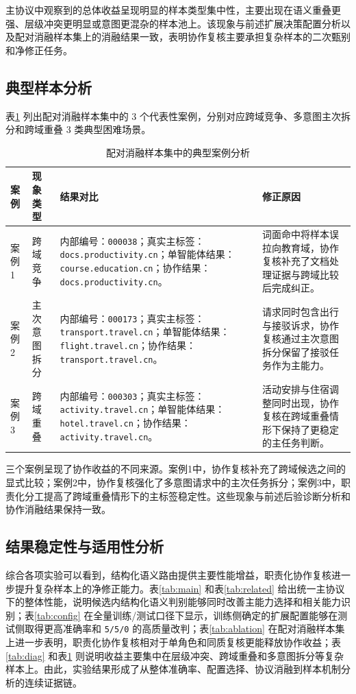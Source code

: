 \documentclass[10pt,a4paper,twocolumn,fontset=fandol]{ctexart}
\begin{document}
主协议中观察到的总体收益呈现明显的样本类型集中性，主要出现在语义重叠更强、层级冲突更明显或意图更混杂的样本池上。该现象与前述扩展决策配置分析以及配对消融样本集上的消融结果一致，表明协作复核主要承担复杂样本的二次甄别和净修正任务。

\subsection{典型样本分析}

表\ref{tab:cases} 列出配对消融样本集中的 3 个代表性案例，分别对应跨域竞争、多意图主次拆分和跨域重叠 3 类典型困难场景。

\begin{table}[htbp]
\centering
\caption{配对消融样本集中的典型案例分析}
\label{tab:cases}
\small
\setlength{\tabcolsep}{4pt}
\begin{tabular}{p{1.8cm}p{1.9cm}p{5.4cm}p{5.6cm}}
\toprule
案例 & 现象类型 & 结果对比 & 修正原因 \\
\midrule
案例1 & 跨域竞争 & 内部编号：\texttt{000038}；真实主标签：\texttt{docs.productivity.cn}；单智能体结果：\texttt{course.education.cn}；协作结果：\texttt{docs.productivity.cn}。 & 词面命中将样本误拉向教育域，协作复核补充了文档处理证据与跨域比较后完成纠正。 \\
案例2 & 主次意图拆分 & 内部编号：\texttt{000173}；真实主标签：\texttt{transport.travel.cn}；单智能体结果：\texttt{flight.travel.cn}；协作结果：\texttt{transport.travel.cn}。 & 请求同时包含出行与接驳诉求，协作复核通过主次意图拆分保留了接驳任务作为主能力。 \\
案例3 & 跨域重叠 & 内部编号：\texttt{000303}；真实主标签：\texttt{activity.travel.cn}；单智能体结果：\texttt{hotel.travel.cn}；协作结果：\texttt{activity.travel.cn}。 & 活动安排与住宿调整同时出现，协作复核在跨域重叠情形下保持了更稳定的主任务判断。 \\
\bottomrule
\end{tabular}
\end{table}

三个案例呈现了协作收益的不同来源。案例1中，协作复核补充了跨域候选之间的显式比较；案例2中，协作复核强化了多意图请求中的主次任务拆分；案例3中，职责化分工提高了跨域重叠情形下的主标签稳定性。这些现象与前述后验诊断分析和协作消融结果保持一致。

\subsection{结果稳定性与适用性分析}

综合各项实验可以看到，结构化语义路由提供主要性能增益，职责化协作复核进一步提升复杂样本上的净修正能力。表\ref{tab:main} 和表\ref{tab:related} 给出统一主协议下的整体性能，说明候选内结构化语义判别能够同时改善主能力选择和相关能力识别；表\ref{tab:config} 在全量训练/测试口径下显示，训练侧确定的扩展配置能够在测试侧取得更高准确率和 \texttt{5/5/0} 的高质量改判；表\ref{tab:ablation} 在配对消融样本集上进一步表明，职责化协作复核相对于单角色和同质复核更能释放协作收益；表\ref{tab:diag} 和表\ref{tab:cases} 则说明收益主要集中在层级冲突、跨域重叠和多意图拆分等复杂样本上。由此，实验结果形成了从整体准确率、配置选择、协议消融到样本机制分析的连续证据链。
\end{document}
